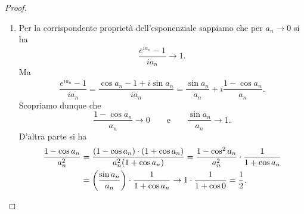 \begin{proof}
\begin{enumerate}
\item
Per la corrispondente proprietà dell'esponenziale
sappiamo che per $a_n \to 0$ si ha
\[
  \frac{e^{ia_n}-1}{i a_n} \to 1.
\]
Ma
\[
  \frac{e^{ia_n}-1}{i a_n}
  = \frac{\cos a_n - 1 + i \sin a_n}{i a_n}
  = \frac{\sin a_n}{a_n} + i\frac{1- \cos a_n  }{a_n}.
\]
Scopriamo dunque che
\[
  \frac{1-\cos a_n}{a_n} \to 0
  \qquad\text{e}\qquad
  \frac{\sin a_n}{a_n} \to 1.
\]
D'altra parte si ha
\begin{align*}
 \frac{1-\cos a_n}{a_n^2}
 &=\frac{(1-\cos a_n)\cdot(1+\cos a_n)}{a_n^2(1+\cos a_n)}
 = \frac{1-\cos^2 a_n}{a_n^2} \cdot \frac{1}{1+\cos a_n}\\
 &= {\left( \frac{\sin a_n}{a_n} \right)}\cdot \frac 1{1+\cos a_n}
 \to 1 \cdot \frac 1 {1+\cos 0} = \frac 1 2.
\end{align*}

\end{enumerate}
\end{proof}

